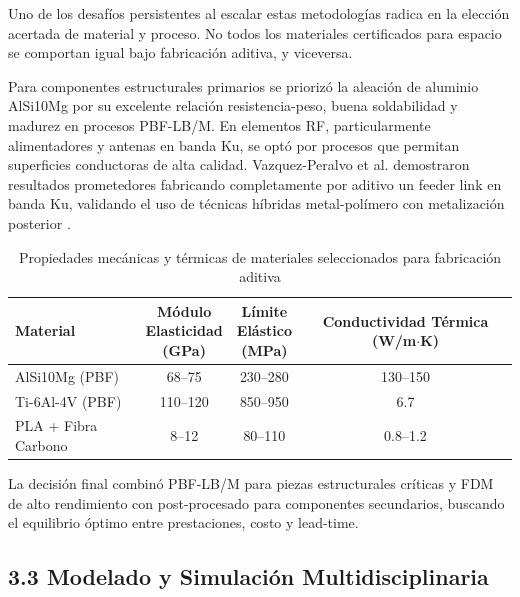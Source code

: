 Uno de los desafíos persistentes al escalar estas metodologías radica en la elección acertada de material y proceso. No todos los materiales certificados para espacio se comportan igual bajo fabricación aditiva, y viceversa.

Para componentes estructurales primarios se priorizó la aleación de aluminio AlSi10Mg por su excelente relación resistencia-peso, buena soldabilidad y madurez en procesos PBF-LB/M. En elementos RF, particularmente alimentadores y antenas en banda Ku, se optó por procesos que permitan superficies conductoras de alta calidad. Vazquez-Peralvo et al. demostraron resultados prometedores fabricando completamente por aditivo un feeder link en banda Ku, validando el uso de técnicas híbridas metal-polímero con metalización posterior \cite{VazquezPeralvo2025}.

\begin{table}[htbp]
\centering
\caption{Propiedades mecánicas y térmicas de materiales seleccionados para fabricación aditiva}
\label{tab:propiedades_materiales}
\scriptsize %
\setlength{\tabcolsep}{3pt} %
\begin{tabularx}{\columnwidth}{>{\raggedright\arraybackslash}X c c c}
\hline
\textbf{Material} & 
\makecell[c]{\textbf{Módulo}\\\textbf{Elasticidad}\\\textbf{(GPa)}} & 
\makecell[c]{\textbf{Límite}\\\textbf{Elástico}\\\textbf{(MPa)}} & 
\makecell[c]{\textbf{Conductividad}\\\textbf{Térmica}\\\textbf{(W/m$\cdot$K)}} \\
\hline
AlSi10Mg (PBF) & 68--75 & 230--280 & 130--150 \\
Ti-6Al-4V (PBF) & 110--120 & 850--950 & 6.7 \\
PLA + Fibra Carbono & 8--12 & 80--110 & 0.8--1.2 \\
\hline
\end{tabularx}
\end{table}

La decisión final combinó PBF-LB/M para piezas estructurales críticas y FDM de alto rendimiento con post-procesado para componentes secundarios, buscando el equilibrio óptimo entre prestaciones, costo y lead-time.

\subsection{3.3 Modelado y Simulación Multidisciplinaria}

